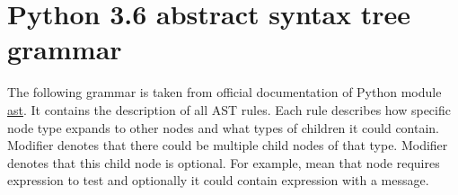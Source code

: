 \chapter{Python 3.6 abstract syntax tree grammar} 
\label{AppendixA} 

The following grammar is taken from official documentation of Python module \href{https://docs.python.org/3/library/ast.html}{ast}. It contains the description of all AST rules. Each rule describes how specific node type expands to other nodes and what types of children it could contain. Modifier \code{*} denotes that there could be multiple child nodes of that type. Modifier  denotes that this child node is optional. For example,  mean that node  requires expression to test and optionally it could contain expression with a message.

